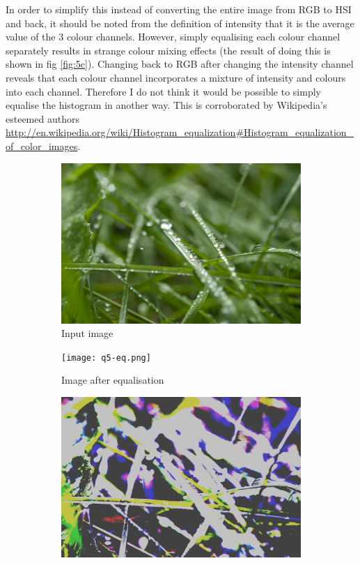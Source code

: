 \documentclass[a4paper]{article}
\begin{document}
In order to simplify this instead of converting the entire image from RGB to HSI and back, it should be noted from the definition of intensity that it is the average value of the 3 colour channels. However, simply equalising each colour channel separately results in strange colour mixing effects (the result of doing this is shown in fig \ref{fig:5c}). Changing back to RGB after changing the intensity channel reveals that each colour channel incorporates a mixture of intensity and colours into each channel. Therefore I do not think it would be possible to simply equalise the histogram in another way. This is corroborated by Wikipedia's esteemed authors \url{http://en.wikipedia.org/wiki/Histogram_equalization#Histogram_equalization_of_color_images}.

\begin{figure}[!h]
        \centering
        \begin{subfigure}[b]{0.3\textwidth}
                \centering
                \includegraphics[width=\textwidth]{q5-orig.png}
                \caption{Input image}
                \label{fig:5a}
        \end{subfigure}
        \begin{subfigure}[b]{0.3\textwidth}
                \centering
                \texttt{[image: q5-eq.png]}
                \caption{Image after equalisation}
                \label{fig:5b}
        \end{subfigure}
        \begin{subfigure}[b]{0.3\textwidth}
                \centering
                \includegraphics[width=\textwidth]{q5-rgb.png}

\end{subfigure}
\end{figure}
\end{document}
